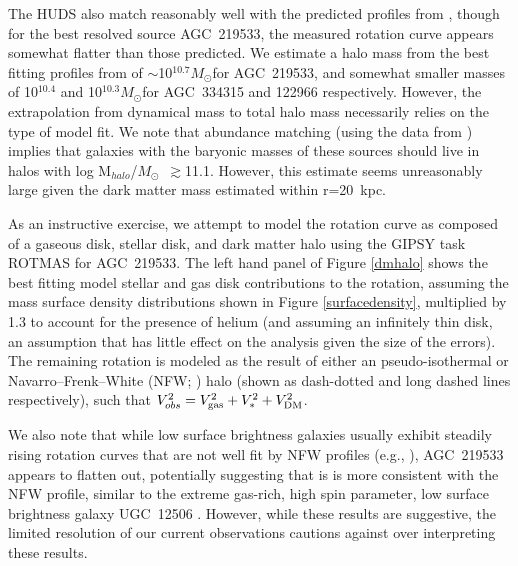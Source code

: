 \documentclass[twocolumn]{aastex6}
\newcommand{\msun}{M_{\odot}}
\def\msun{$M_\odot$}
\begin{document}
The HUDS also match reasonably well with the predicted profiles from \cite{dicintio16a}, 
though for the best resolved source AGC~219533, the measured rotation curve appears somewhat flatter than those predicted. We estimate a halo mass from the best fitting profiles from \cite{dicintio16a} of $\sim$10$^{10.7}$\msun for AGC~219533, and somewhat smaller masses of 10$^{10.4}$ and 10$^{10.3}$\msun for AGC~334315 and 122966 respectively. 
However, the extrapolation from dynamical mass to total halo mass necessarily relies on the type of model fit. We note that abundance matching (using the data from \citealp{papastergis12a}) implies that galaxies with the baryonic masses of these sources should live in halos with log M$_{halo}$/\msun\ $\gtrsim$11.1. However, this estimate seems unreasonably large given the dark matter mass estimated within r=20~kpc.

 As an instructive exercise, we attempt to model the rotation curve as composed of a gaseous disk, stellar disk, and dark matter halo using the GIPSY task ROTMAS for AGC~219533. The left hand panel of Figure \ref{dmhalo} shows the best fitting model stellar and gas disk contributions to the rotation, assuming the mass surface density distributions shown in Figure \ref{surfacedensity}, multiplied by 1.3 to account for the presence of helium (and assuming an infinitely thin disk, an assumption that has little effect on the analysis given the size of the errors). The remaining rotation is modeled as the result of either an pseudo-isothermal or Navarro--Frenk--White (NFW; \citealp{navarro97a}) halo (shown as dash-dotted and long dashed lines respectively), such that $V_{obs}^2=V_{\rm gas}^2+V_*^2+V_{\rm DM}^2$.  %

We also note that while low surface brightness galaxies usually exhibit steadily rising rotation curves that are not well fit by NFW profiles (e.g., \citealp{mcgaugh98a}), AGC~219533 appears to flatten out, potentially suggesting that is is more consistent with the NFW profile, similar to the extreme gas-rich, high spin parameter, low surface brightness galaxy UGC~12506 \citep{hallenbeck14a}. However, while these results are suggestive, the limited resolution of our current observations cautions against over interpreting these results.
\end{document}
